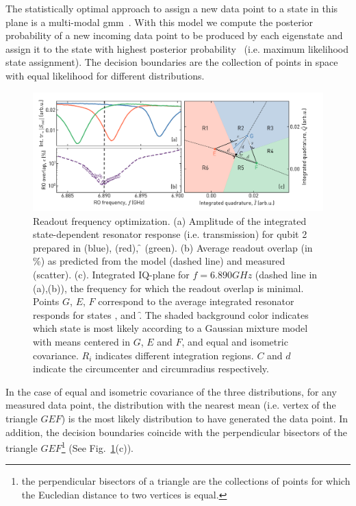 The statistically optimal approach to assign a new data point to a state in this plane is a multi-modal \gls{gmm}~\cite{Bishop2006, Hastie2017, Reuer2018}.
With this model we compute the posterior probability of a new incoming data point to be produced by each eigenstate and assign it to the state with highest posterior probability~\cite{Lacroix2019} (i.e. maximum likelihood state assignment). The decision boundaries are the collection of points in space with equal likelihood for different distributions.

\begin{figure}[ht]
    \centering
    \includegraphics[width=\textwidth]{appendices/qutrit_readout/figs/ch3_readout_frequency_opt__with_iq_20200301_174851_ppt.png}
    \caption{Readout frequency optimization. (a) Amplitude of the integrated state-dependent resonator response (i.e. transmission) for qubit 2 prepared in \g{} (blue), \e{} (red), \f{} (green). (b) Average readout overlap (in \%) as predicted from the model (dashed line) and measured (scatter). (c). Integrated IQ-plane for $f = 6.890\unit{GHz}$ (dashed line in (a),(b)), the frequency for which the readout overlap is minimal. Points $G$, $E$, $F$ correspond to the average integrated resonator responds for states \g,\e{} and \f.  The shaded background color indicates which state is most likely according to a Gaussian mixture model with means centered in $G$, $E$ and $F$, and equal and isometric covariance. $R_i$ indicates different integration regions.  $C$ and $d$ indicate the circumcenter and circumradius respectively. }
    \label{fig:qutrit_readout_ro_freq_opt}
\end{figure}

In the case of equal and isometric covariance of the three distributions, for any measured data point, the distribution with the nearest mean (i.e. vertex of the triangle $GEF$) is the most likely distribution to have generated the data point. In addition, the decision boundaries coincide with the perpendicular bisectors of the triangle $GEF$\footnote{the perpendicular bisectors of a triangle are the collections of points for which the Eucledian distance to two vertices is equal.} (See Fig.~\ref{fig:qutrit_readout_ro_freq_opt}(c)).

